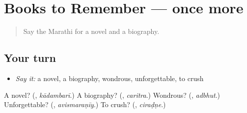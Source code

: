 \section[(dialogue)]{Books to Remember — once more}

\label{lesson:MR-R341-review-final-341}



\begin{quote}
Say the Marathi for a novel and a biography.
\end{quote}

\subsection*{Your turn}
\begin{itemize}
\raggedright
  \item \emph{Say it:} a novel, a biography, wondrous, unforgettable, to crush
\end{itemize}

\begin{tcolorbox}[breakable,colback=teal!4,colframe=teal!35!black,title={Before you move on}]
A novel? (\textbf{}, \emph{kādambarī}.) A biography? (\textbf{}, \emph{caritra}.) Wondrous? (\textbf{}, \emph{adbhut}.) Unforgettable? (\textbf{}, \emph{avismaraṇīy}.) To crush? (\textbf{}, \emph{ciraḍṇe}.)
\end{tcolorbox}
